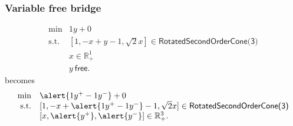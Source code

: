 \documentclass{beamer}
\begin{document}
\begin{frame}
  \frametitle{Variable free bridge}
\begin{equation*}
    \begin{array}{rl}
        \min & 1y + 0\\
        \text{s.t.} & [1, -x + y - 1, \sqrt 2x] \in \textsf{RotatedSecondOrderCone(3)}\\
        & x \in \mathbb{R}^1_+\\
        & y\ \mathsf{free}.
    \end{array}
\end{equation*}
becomes
\begin{equation*}
    \begin{array}{rl}
        \min & \alert{1y^+ - 1 y^-} + 0\\
        \text{s.t.} & [1, -x + \alert{1y^+ - 1 y^-} - 1, \sqrt 2x] \in \textsf{RotatedSecondOrderCone(3)}\\
        & [x, \alert{y^+}, \alert{y^-}] \in \mathbb{R}^3_+.
    \end{array}
\end{equation*}
\end{frame}
\end{document}
